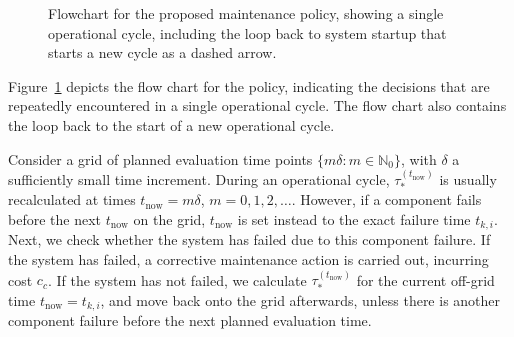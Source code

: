 \documentclass[authoryear]{elsarticle}
\newcommand{\naturals}{\mathbb{N}}
\def\tnow{t_\text{now}}
\newcommand{\tausnow}{\tau_*^{(\tnow)}}
\begin{document}
\begin{figure}
\begin{tikzpicture}
\end{tikzpicture}
\caption{Flowchart for the proposed maintenance policy,
showing a single operational cycle,
including the loop back to system startup that starts a new cycle as a dashed arrow.}
\label{fig:procedure}
\end{figure}

Figure~\ref{fig:procedure} depicts the flow chart for the policy,
indicating the decisions that are repeatedly encountered in a single operational cycle.
The flow chart also contains the loop back to the start of a new operational cycle.

Consider a grid of planned evaluation time points $\{m \delta : m \in \naturals_0\}$,
with $\delta$ a sufficiently small time increment.
During an operational cycle,
$\tausnow$ is usually recalculated at times $\tnow = m \delta$, $m = 0, 1, 2, \ldots$.
However, if a component fails before the next $\tnow$ on the grid,
$\tnow$ is set instead to the exact failure time $t_{k,i}$.
Next, we check whether the system has failed due to this component failure.
If the system has failed, a corrective maintenance action is carried out, incurring cost $c_c$.
If the system has not failed, we calculate $\tausnow$ for the current off-grid time $\tnow = t_{k,i}$,
and move back onto the grid afterwards,
unless there is another component failure before the next planned evaluation time.
\end{document}
